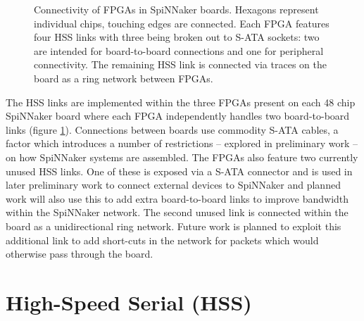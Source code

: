 			\begin{figure}
				\center
				
				
				\caption[Connectivity of FPGAs in SpiNNaker boards.]{Connectivity of
				FPGAs in SpiNNaker boards. Hexagons represent individual chips, touching
				edges are connected. Each FPGA features four HSS links with three being
				broken out to S-ATA sockets: two are intended for board-to-board
				connections and one for peripheral connectivity. The remaining HSS link
				is connected via traces on the board as a ring network between FPGAs.}
				\label{fig:board-to-board-links}
			\end{figure}
			
			\label{sec:spinnaker-fpgas}
			
			The HSS links are implemented within the three FPGAs present on each 48
			chip SpiNNaker board where each FPGA independently handles two
			board-to-board links (figure \ref{fig:board-to-board-links}). Connections
			between boards use commodity S-ATA cables, a factor which introduces a
			number of restrictions -- explored in preliminary work -- on how SpiNNaker
			systems are assembled. The FPGAs also feature two currently unused HSS
			links. One of these is exposed via a S-ATA connector and is used in later
			preliminary work to connect external devices to SpiNNaker and planned work
			will also use this to add extra board-to-board links to improve bandwidth
			within the SpiNNaker network. The second unused link is connected within
			the board as a unidirectional ring network. Future work is planned to
			exploit this additional link to add short-cuts in the network for packets
			which would otherwise pass through the board.
	
	\section{High-Speed Serial (HSS)}
		\label{sec:high-speed-serial}
		
		
